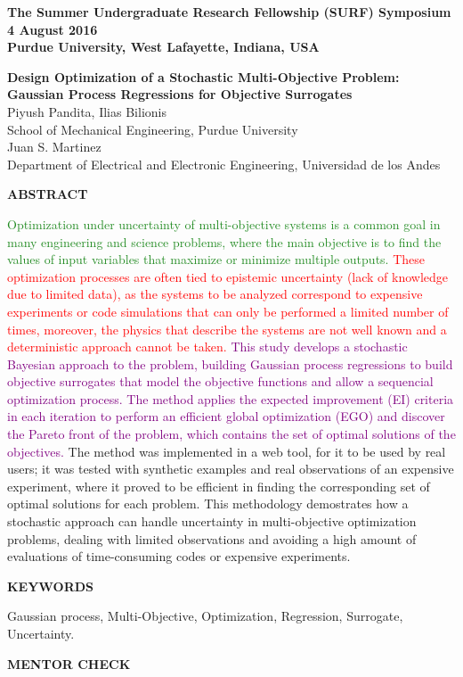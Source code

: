 \documentclass[a4paper]{article}
\begin{document}
{\footnotesize
  \textbf{The Summer Undergraduate Research Fellowship (SURF) Symposium\\
    4 August 2016\\
    Purdue University, West Lafayette, Indiana, USA\\
    }
}
\begin{center}
{\Large \textbf{Design Optimization of a Stochastic Multi-Objective Problem: Gaussian Process Regressions for Objective Surrogates\\}}
{\normalsize Piyush Pandita, Ilias Bilionis\\
School of Mechanical Engineering, Purdue University\\
Juan S. Martinez\\
Department of Electrical and Electronic Engineering, Universidad de los Andes\\
}
\end{center}
{\large \textbf{ABSTRACT}\\}

{\normalsize \textcolor{ForestGreen}{Optimization under uncertainty of multi-objective systems is a common goal in many engineering and science problems, where the main objective is to find the values of input variables that maximize or minimize multiple outputs. }\textcolor{red}{These optimization processes are often tied to epistemic uncertainty (lack of knowledge due to limited data), as the systems to be analyzed correspond to expensive experiments or code simulations that can only be performed a limited number of times, moreover, the physics that describe the systems are not well known and a deterministic approach cannot be taken. }\textcolor{Purple}{This study develops a stochastic Bayesian approach to the problem, building Gaussian process regressions to build objective surrogates that model the objective functions and allow a sequencial optimization process. The method applies the expected improvement (EI) criteria in each iteration to perform an efficient global optimization (EGO) and discover the Pareto front of the problem, which contains the set of optimal solutions of the objectives. }\textcolor{TealBlue}{The method was implemented in a web tool, for it to be used by real users; it was tested with synthetic examples and real observations of an expensive experiment, where it proved to be efficient in finding the corresponding set of optimal solutions for each problem. }This methodology demostrates how a stochastic approach can handle uncertainty in multi-objective optimization problems, dealing with limited observations and avoiding a high amount of evaluations of time-consuming codes or expensive experiments.\\}

{\large \textbf{KEYWORDS}\\}

{\normalsize Gaussian process, Multi-Objective, Optimization, Regression, Surrogate, Uncertainty.\\}

{\large \textbf{MENTOR CHECK}\\}
\end{document}
